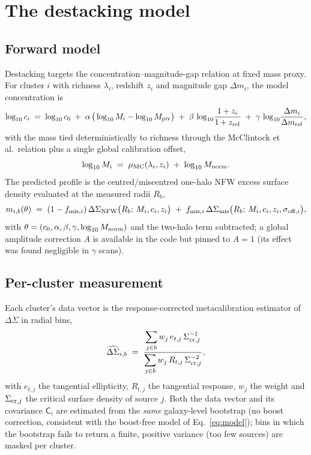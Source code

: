 \documentclass[11pt,a4paper]{article}
\newcommand{\DSigma}{\Delta\Sigma}
\begin{document}
\section{The destacking model}
\label{sec:destacking}

\subsection{Forward model}

Destacking targets the concentration--magnitude-gap relation at fixed mass
proxy. For cluster $i$ with richness $\lambda_i$, redshift $z_i$ and
magnitude gap $\Delta m_i$, the model concentration is
\begin{equation}
\log_{10} c_i \;=\; \log_{10} c_0
\;+\; \alpha\,\big(\log_{10} M_i - \log_{10} M_{\rm piv}\big)
\;+\; \beta\,\log_{10}\!\frac{1+z_i}{1+z_{\rm ref}}
\;+\; \gamma\,\log_{10}\!\frac{\Delta m_i}{\Delta m_{\rm ref}},
\label{eq:crel}
\end{equation}
with the mass tied deterministically to richness through the McClintock
et al.\ relation \cite{mcclintock19} plus a single global calibration
offset,
\begin{equation}
\log_{10} M_i \;=\; \mu_{\rm MC}(\lambda_i, z_i) \;+\; \log_{10} M_{\rm norm}.
\label{eq:mlambda}
\end{equation}
The predicted profile is the centred/miscentred one-halo NFW
\cite{nfw97,wright00} excess surface density evaluated at the measured
radii $R_b$,
\begin{equation}
m_{i,b}(\theta) \;=\;
(1 - f_{{\rm mis},i})\,\DSigma_{\rm NFW}\big(R_b;\, M_i, c_i, z_i\big)
\;+\; f_{{\rm mis},i}\,\DSigma_{\rm mis}\big(R_b;\, M_i, c_i, z_i,
\sigma_{{\rm off},i}\big),
\label{eq:model}
\end{equation}
with $\theta = (c_0, \alpha, \beta, \gamma, \log_{10} M_{\rm norm})$ and the
two-halo term subtracted; a global amplitude correction $A$ is available in
the code but pinned to $A=1$ (its effect was found negligible in $\gamma$
scans).

\subsection{Per-cluster measurement}

Each cluster's data vector is the response-corrected metacalibration
\cite{sheldon17} estimator of $\DSigma$ in radial bins,
\begin{equation}
\widehat{\DSigma}_{i,b} \;=\;
\frac{\displaystyle\sum_{j \in b} w_j\, e_{t,j}\,\Sigma_{{\rm cr},j}^{-1}}
{\displaystyle\sum_{j \in b} w_j\, R_{t,j}\, \Sigma_{{\rm cr},j}^{-2}},
\label{eq:estimator}
\end{equation}
with $e_{t,j}$ the tangential ellipticity, $R_{t,j}$ the tangential
response, $w_j$ the weight and $\Sigma_{{\rm cr},j}$ the critical surface
density of source $j$. Both the data vector and its covariance
$\mathsf{C}_i$ are estimated from the \emph{same} galaxy-level bootstrap
(no boost correction, consistent with the boost-free model of
Eq.~\ref{eq:model}); bins in which the bootstrap fails to return a finite,
positive variance (too few sources) are masked per cluster.
\end{document}
